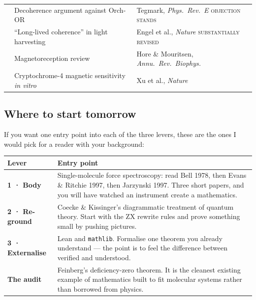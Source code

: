 \begin{center}
\begin{tabular}{@{}>{\raggedright\arraybackslash}p{1.35cm}>{\raggedright\arraybackslash}p{6.0cm}>{\raggedright\arraybackslash}p{9.2cm}@{}}
2000 & Decoherence argument against Orch-OR & Tegmark, \textit{Phys.\ Rev.\ E} \;\textsc{objection stands}\\
2007 & ``Long-lived coherence'' in light harvesting & Engel et al., \textit{Nature}
 \;\textsc{substantially revised}\\
2016 & Magnetoreception review & Hore \& Mouritsen, \textit{Annu.\ Rev.\ Biophys.}\\
2021 & Cryptochrome-4 magnetic sensitivity \emph{in vitro} & Xu et al., \textit{Nature}\\
\bottomrule
\end{tabular}
\end{center}

\subsection{Where to start tomorrow}

If you want one entry point into each of the three levers, these are the ones I would pick for a
reader with your background:

\begin{center}\small
\begin{tabular}{@{}>{\raggedright\arraybackslash}p{3.0cm}>{\raggedright\arraybackslash}p{13.6cm}@{}}
\toprule
\rowcolor{slate!14}
\textbf{Lever} & \textbf{Entry point}\\
\midrule
\textbf{\color{sand}1 · Body} & Single-molecule force spectroscopy: read Bell 1978, then Evans \&
 Ritchie 1997, then Jarzynski 1997. Three short papers, and you will have watched an instrument
 create a mathematics.\\
\textbf{\color{quantum}2 · Re-ground} & Coecke \& Kissinger's diagrammatic treatment of quantum
 theory. Start with the ZX rewrite rules and prove something small by pushing pictures.\\
\textbf{\color{ember}3 · Externalise} & Lean and \texttt{mathlib}. Formalise one theorem you already
 understand --- the point is to feel the difference between verified and understood.\\
\rowcolor{bio!8}
\textbf{\color{bio}The audit} & Feinberg's deficiency-zero theorem. It is the cleanest existing example
 of mathematics built to fit molecular systems rather than borrowed from physics.\\
\bottomrule
\end{tabular}
\end{center}

